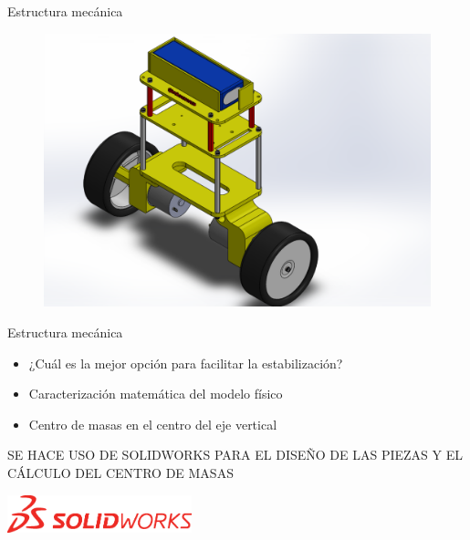 \documentclass{beamer}
\begin{document}
\begin{frame}{Estructura mecánica}
\begin{center}
	\begin{figure}[H]
		\center
		\includegraphics[trim = 2cm 0mm 8cm 0mm,clip, angle=0, scale = 0.35]{imagenes/Balancing_Robot/EnsanBalanceCab.PDF}
	\end{figure}
\end{center}
\end{frame}

\begin{frame}{Estructura mecánica}
	\begin{block}{}	
		\begin{itemize}
			\item ¿Cuál es la mejor opción para facilitar la estabilización? \pause
			\item Caracterización matemática del modelo físico \pause
			\item Centro de masas en el centro del eje vertical \pause
		\end{itemize}
	\end{block}
	\begin{alertblock}{}
		SE HACE USO DE SOLIDWORKS PARA EL DISEÑO DE LAS PIEZAS Y EL CÁLCULO DEL CENTRO DE MASAS
		\begin{center}
			\includegraphics [width =0.4\textwidth ]{imagenes/SolidWorks-01}
		\end{center}
	\end{alertblock}


\end{frame}
\end{document}
